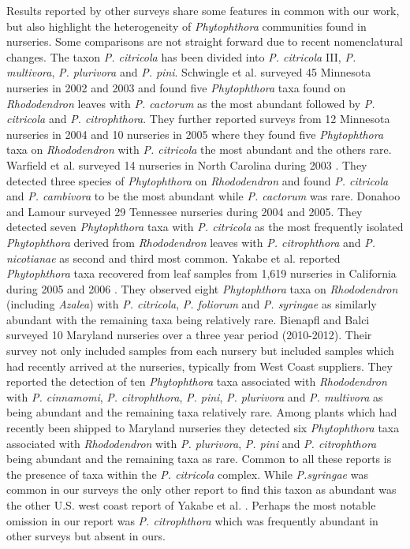 \documentclass[12pt]{article}
\begin{document}
Results reported by other surveys share some features in common with our work, but also highlight the heterogeneity of \emph{Phytophthora} communities found in nurseries.  Some comparisons are not straight forward due to recent nomenclatural changes.  The taxon \emph{P. citricola} has been divided into \emph{P. citricola} III, \emph{P. multivora}, \emph{P. plurivora} and \emph{P. pini}\cite{jung_burgess_2009, hong2011, ginetti_etal_2013}.  Schwingle et al.\cite{schwingle_etal_2007} surveyed 45 Minnesota nurseries in 2002 and 2003 and found five \emph{Phytophthora} taxa found on \emph{Rhododendron} leaves with \emph{P. cactorum} as the most abundant followed by \emph{P. citricola} and \emph{P. citrophthora}.  They further reported surveys from 12 Minnesota nurseries in 2004 and 10 nurseries in 2005 where they found five \emph{Phytophthora} taxa on \emph{Rhododendron} with \emph{P. citricola} the most abundant and the others rare.  Warfield et al. surveyed 14 nurseries in North Carolina during 2003 \cite{warfield_etal_2008}.  They detected three species of \emph{Phytophthora} on \emph{Rhododendron} and found \emph{P. citricola} and \emph{P. cambivora} to be the most abundant while \emph{P. cactorum} was rare.  Donahoo and Lamour surveyed 29 Tennessee nurseries during 2004 and 2005\cite{donahoo_lamour_2008}.  They detected seven \emph{Phytophthora} taxa with \emph{P. citricola} as the most frequently isolated \emph{Phytophthora} derived from \emph{Rhododendron} leaves with \emph{P. citrophthora} and \emph{P. nicotianae} as second and third most common.  Yakabe et al. reported \emph{Phytophthora} taxa recovered from leaf samples from 1,619 nurseries in California during 2005 and 2006 \cite{yakabe_etal_2009}.  They observed eight \emph{Phytophthora} taxa on \emph{Rhododendron} (including \emph{Azalea}) with \emph{P. citricola}, \emph{P. foliorum} and \emph{P. syringae} as similarly abundant with the remaining taxa being relatively rare.  Bienapfl and Balci \cite{bienapfl_balci_2013} surveyed 10 Maryland nurseries over a three year period (2010-2012).  Their survey not only included samples from each nursery but included samples which had recently arrived at the nurseries, typically from West Coast suppliers.  They reported the detection of ten \emph{Phytophthora} taxa associated with \emph{Rhododendron} with \emph{P. cinnamomi}, \emph{P. citrophthora}, \emph{P. pini}, \emph{P. plurivora} and \emph{P. multivora} as being abundant and the remaining taxa relatively rare.  Among plants which had recently been shipped to Maryland nurseries they detected six \emph{Phytophthora} taxa associated with \emph{Rhododendron} with \emph{P. plurivora}, \emph{P. pini} and \emph{P. citrophthora} being abundant and the remaining taxa as rare.  Common to all these reports is the presence of taxa within the \emph{P. citricola} complex.  While \emph{P.syringae} was common in our surveys the only other report to find this taxon as abundant was the other U.S. west coast report of Yakabe et al. \cite{yakabe_etal_2009}.  Perhaps the most notable omission in our report was \emph{P. citrophthora} which was frequently abundant in other surveys but absent in ours.
\end{document}

